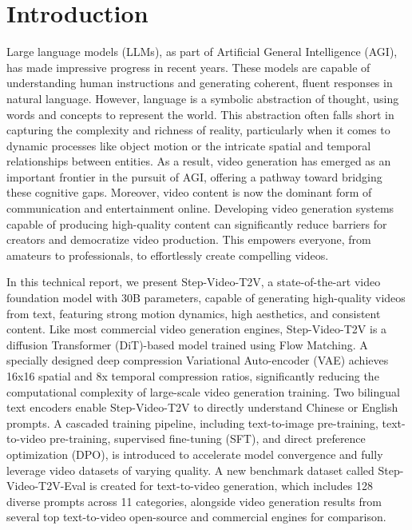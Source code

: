 \section{Introduction}

Large language models (LLMs), as part of Artificial General Intelligence (AGI), has made impressive progress in recent years. These models are capable of understanding human instructions and generating coherent, fluent responses in natural language. However, language is a symbolic abstraction of thought, using words and concepts to represent the world. This abstraction often falls short in capturing the complexity and richness of reality, particularly when it comes to dynamic processes like object motion or the intricate spatial and temporal relationships between entities.
As a result, video generation has emerged as an important frontier in the pursuit of AGI, offering a pathway toward bridging these cognitive gaps. Moreover, video content is now the dominant form of communication and entertainment online. Developing video generation systems capable of producing high-quality content can significantly reduce barriers for creators and democratize video production. This empowers everyone, from amateurs to professionals, to effortlessly create compelling videos.

In this technical report, we present Step-Video-T2V, a state-of-the-art video foundation model with 30B parameters, capable of generating high-quality videos from text, featuring strong motion dynamics, high aesthetics, and consistent content. Like most commercial video generation engines, Step-Video-T2V is a diffusion Transformer (DiT)-based model trained using Flow Matching. A specially designed deep compression Variational Auto-encoder (VAE) achieves 16x16 spatial and 8x temporal compression ratios, significantly reducing the computational complexity of large-scale video generation training. Two bilingual text encoders enable Step-Video-T2V to directly understand Chinese or English prompts. A cascaded training pipeline, including text-to-image pre-training, text-to-video pre-training, supervised fine-tuning (SFT), and direct preference optimization (DPO), is introduced to accelerate model convergence and fully leverage video datasets of varying quality. A new benchmark dataset called Step-Video-T2V-Eval is created for text-to-video generation, which includes 128 diverse prompts across 11 categories, alongside video generation results from several top text-to-video open-source and commercial engines for comparison.

